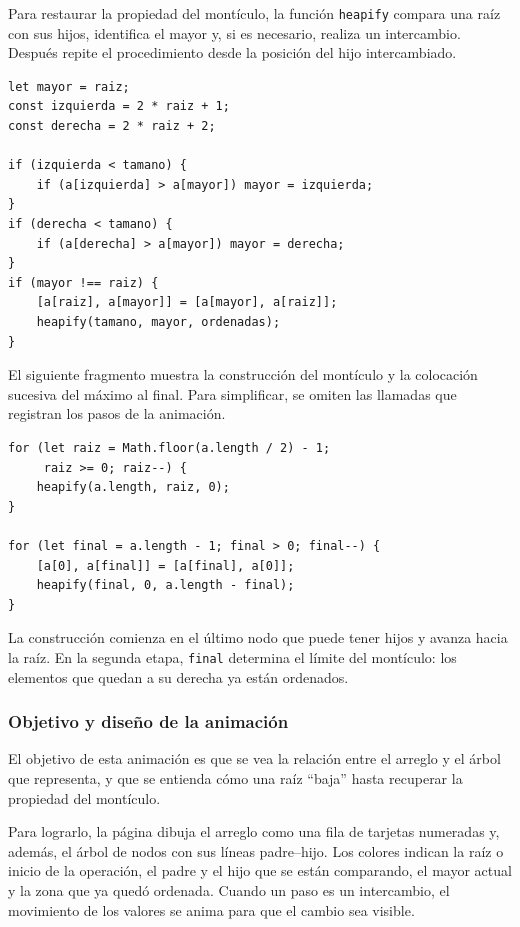 \documentclass[11pt,letterpaper]{article}
\begin{document}
Para restaurar la propiedad del montículo, la función \texttt{heapify} compara una raíz con sus hijos, identifica el mayor y, si es necesario, realiza un intercambio. Después repite el procedimiento desde la posición del hijo intercambiado.

\begin{lstlisting}[caption={Restauración del montículo en Heap Sort}]
let mayor = raiz;
const izquierda = 2 * raiz + 1;
const derecha = 2 * raiz + 2;

if (izquierda < tamano) {
    if (a[izquierda] > a[mayor]) mayor = izquierda;
}
if (derecha < tamano) {
    if (a[derecha] > a[mayor]) mayor = derecha;
}
if (mayor !== raiz) {
    [a[raiz], a[mayor]] = [a[mayor], a[raiz]];
    heapify(tamano, mayor, ordenadas);
}
\end{lstlisting}

El siguiente fragmento muestra la construcción del montículo y la colocación sucesiva del máximo al final. Para simplificar, se omiten las llamadas que registran los pasos de la animación.

\begin{lstlisting}[caption={Construcción y extracción en Heap Sort}]
for (let raiz = Math.floor(a.length / 2) - 1;
     raiz >= 0; raiz--) {
    heapify(a.length, raiz, 0);
}

for (let final = a.length - 1; final > 0; final--) {
    [a[0], a[final]] = [a[final], a[0]];
    heapify(final, 0, a.length - final);
}
\end{lstlisting}

La construcción comienza en el último nodo que puede tener hijos y avanza hacia la raíz. En la segunda etapa, \texttt{final} determina el límite del montículo: los elementos que quedan a su derecha ya están ordenados.

\subsubsection{Objetivo y diseño de la animación}

El objetivo de esta animación es que se vea la relación entre el arreglo y el árbol que representa, y que se entienda cómo una raíz ``baja'' hasta recuperar la propiedad del montículo.

Para lograrlo, la página dibuja el arreglo como una fila de tarjetas numeradas y, además, el árbol de nodos con sus líneas padre--hijo. Los colores indican la raíz o inicio de la operación, el padre y el hijo que se están comparando, el mayor actual y la zona que ya quedó ordenada. Cuando un paso es un intercambio, el movimiento de los valores se anima para que el cambio sea visible.
\end{document}
